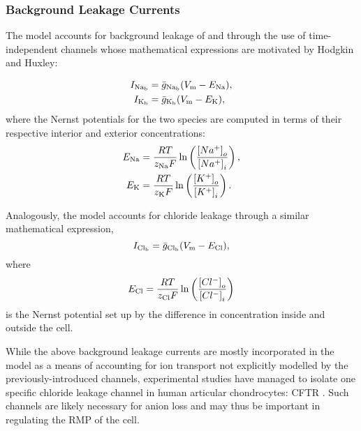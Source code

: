 \subsubsection*{Background Leakage Currents}
\label{sec:background-currents}

The model accounts for background leakage of \Na{} and \K{} through
the use of time-independent channels whose mathematical expressions
are motivated by Hodgkin and Huxley:

\begin{equation}
  \begin{split}
    I_{\rm Na_b} & = \bar{g}_{\rm Na_b} (V_{\rm m} - E_{\rm Na}),\\
    I_{\rm K_b} & = \bar{g}_{\rm K_b} (V_{\rm m} - E_{\rm K}),\\
  \end{split}
\end{equation}
where the Nernst potentials for the two species are computed in terms
of their respective interior and exterior concentrations:
\begin{equation*}
  \begin{split}
    E_{\rm Na} & =  \frac{R T}{z_{\rm Na} F}
    \ln\left(\frac{\left[Na^{+}\right]_{o}}
      {\left[Na^{+}\right]_{i}}\right),\\
    E_{\rm K} & =  \frac{R T}{z_{\rm K} F}
    \ln\left(\frac{\left[K^{+}\right]_{o}}
      {\left[K^{+}\right]_{i}}\right).
  \end{split}
\end{equation*}

Analogously, the model accounts for chloride leakage through a similar
mathematical expression,
\begin{equation}
  I_{\rm Cl_b} = \bar{g}_{\rm Cl_b} (V_{\rm m} - E_{\rm Cl}),
  \label{I_Cl_b}
\end{equation}
where
\begin{equation*}
  E_{\rm Cl} =  \frac{R T}{z_{\rm Cl} F}
  \ln\left(\frac{\left[Cl^{-}\right]_{o}}
          {\left[Cl^{-}\right]_{i}}\right)
\end{equation*}
is the Nernst potential set up by the difference in \Cl{}
concentration inside and outside the cell.

While the above background leakage currents are mostly incorporated in
the model as a means of accounting for ion transport not explicitly
modelled by the previously-introduced channels, experimental studies
have managed to isolate one specific chloride leakage channel in human
articular chondrocytes: CFTR \citep{UNKNOWN}. Such channels are likely
necessary for anion loss and may thus be important in regulating the
RMP of the cell.

